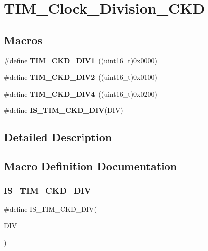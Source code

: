 \section{T\+I\+M\+\_\+\+Clock\+\_\+\+Division\+\_\+\+C\+KD}
\label{group__TIM__Clock__Division__CKD}
\subsection*{Macros}
\begin{DoxyCompactItemize}
\item 
\#define \textbf{ T\+I\+M\+\_\+\+C\+K\+D\+\_\+\+D\+I\+V1}~((uint16\+\_\+t)0x0000)
\item 
\#define \textbf{ T\+I\+M\+\_\+\+C\+K\+D\+\_\+\+D\+I\+V2}~((uint16\+\_\+t)0x0100)
\item 
\#define \textbf{ T\+I\+M\+\_\+\+C\+K\+D\+\_\+\+D\+I\+V4}~((uint16\+\_\+t)0x0200)
\item 
\#define \textbf{ I\+S\+\_\+\+T\+I\+M\+\_\+\+C\+K\+D\+\_\+\+D\+IV}(D\+IV)
\end{DoxyCompactItemize}


\subsection{Detailed Description}


\subsection{Macro Definition Documentation}
\mbox{\label{group__TIM__Clock__Division__CKD_ga9298ec9ad2d578a4c54e6c0dd4c03946}} 
\subsubsection{I\+S\+\_\+\+T\+I\+M\+\_\+\+C\+K\+D\+\_\+\+D\+IV}
{\footnotesize\ttfamily \#define I\+S\+\_\+\+T\+I\+M\+\_\+\+C\+K\+D\+\_\+\+D\+IV(\begin{DoxyParamCaption}\item[{}]{D\+IV }\end{DoxyParamCaption})}

